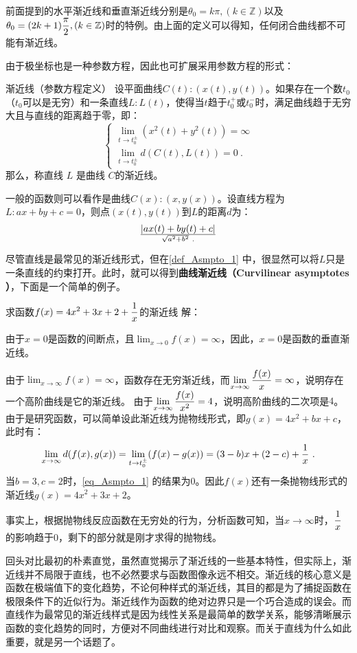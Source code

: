 前面提到的水平渐近线和垂直渐近线分别是$\theta_0=k\pi,(k\in\mathbb{Z})$以及$\displaystyle\theta_0=(2k+1){\pi\over2},(k\in\mathbb{Z})$时的特例。由上面的定义可以得知，任何闭合曲线都不可能有渐近线。

由于极坐标也是一种参数方程，因此也可扩展采用参数方程的形式：

\begin{definition}{渐近线（参数方程定义）}\label{def_Asmpto_1}
设平面曲线$C(t):\left(x(t),y(t)\right)$。如果存在一个数$t_0$（$t_0$可以是无穷）和一条直线$L:L(t)$，使得当$t$趋于$t_0^+$或$t_0^-$时，满足曲线趋于无穷大且与直线的距离趋于零，即：
\begin{equation}
\begin{cases}
\displaystyle\lim_{t \to t^\pm_0} \left(x^2(t)+y^2(t)\right) = \infty\\
\displaystyle\lim_{t \to t^\pm_0} d(C(t), L(t)) = 0~.
\end{cases}
\end{equation}
那么，称直线  $L$  是曲线  $C$的渐近线。
\end{definition}

一般的函数则可以看作是曲线$C(x):\left(x,y(x)\right)$。设直线方程为$L:ax+by+c=0$，则点$\left(x(t),y(t)\right)$到$L$的距离$d$为：
\begin{equation}
|ax(t)+by(t)+c|\over\sqrt{a^2+b^2}~.
\end{equation}

尽管直线是最常见的渐近线形式，但在\autoref{def_Asmpto_1} 中，很显然可以将$L$只是一条直线的约束打开。此时，就可以得到\textbf{曲线渐近线（Curvilinear asymptotes ）}，下面是一个简单的例子。

\begin{example}{求函数$\displaystyle f(x)=4x^2+3x+2+{1\over x}$的渐近线}
解：

由于$x=0$是函数的间断点，且$\displaystyle\lim_{x\to0}f(x)=\infty$，因此，$x=0$是函数的垂直渐近线。

由于$\displaystyle\lim_{x\to\infty}f(x)=\infty$，函数存在无穷渐近线，而$\displaystyle\lim_{x\to\infty}{f(x)\over x}=\infty$，说明存在一个高阶曲线是它的渐近线。
由于$\displaystyle\lim_{x\to\infty}{f(x)\over x^2}=4$，说明高阶曲线的二次项是$4$。由于是研究函数，可以简单设此渐近线为抛物线形式，即$g(x)=4x^2+bx+c$，此时有：
\begin{equation}\label{eq_Asmpto_1}
\displaystyle\lim_{x \to \infty} d(f(x), g(x)) =\displaystyle\lim_{t \to t^\pm_0} (f(x)-g(x))=(3-b)x+(2-c)+{1\over x}~.
\end{equation}
当$b=3,c=2$时，\autoref{eq_Asmpto_1} 的结果为$0$。因此$f(x)$还有一条抛物线形式的渐近线$g(x)=4x^2+3x+2$。

事实上，根据抛物线反应函数在无穷处的行为，分析函数可知，当$x\to\infty$时，$\displaystyle{1\over x}$的影响趋于$0$，剩下的部分就是刚才求得的抛物线。
\end{example}

回头对比最初的朴素直觉，虽然直觉揭示了渐近线的一些基本特性，但实际上，渐近线并不局限于直线，也不必然要求与函数图像永远不相交。渐近线的核心意义是函数在极端值下的变化趋势，不论何种样式的渐近线，其目的都是为了捕捉函数在极限条件下的近似行为。渐近线作为函数的绝对边界只是一个巧合造成的误会。而直线作为最常见的渐近线样式是因为线性关系是最简单的数学关系，能够清晰展示函数的变化趋势的同时，方便对不同曲线进行对比和观察。而关于直线为什么如此重要，就是另一个话题了。
